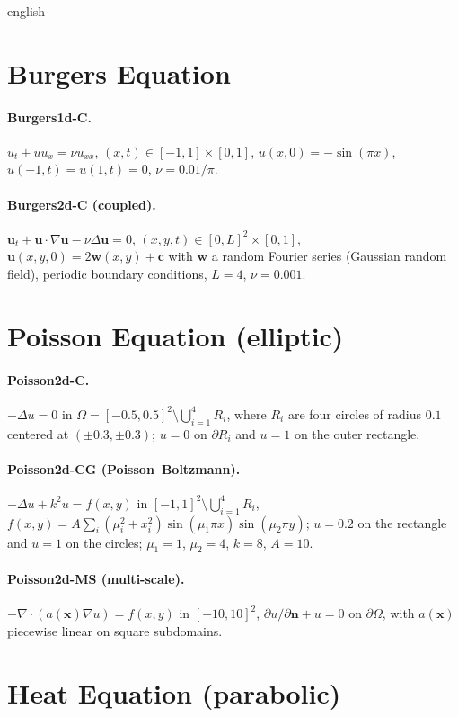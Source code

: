 \documentclass[12pt,letterpaper,twoside]{book}
\begin{document}
\begin{hyphenrules}{english}
\section{Burgers Equation}
\paragraph{Burgers1d-C.} $u_t+uu_x=\nu u_{xx}$, $(x,t)\in[-1,1]\times[0,1]$, $u(x,0)=-\sin(\pi x)$,
$u(-1,t)=u(1,t)=0$, $\nu=0.01/\pi$.

\paragraph{Burgers2d-C (coupled).} $\mathbf{u}_t+\mathbf{u}\cdot\nabla\mathbf{u}-\nu\Delta\mathbf{u}=0$,
$(x,y,t)\in[0,L]^2\times[0,1]$, $\mathbf{u}(x,y,0)=2\mathbf{w}(x,y)+\mathbf{c}$ with $\mathbf{w}$ a random
Fourier series (Gaussian random field), periodic boundary conditions, $L=4$, $\nu=0.001$.

\section{Poisson Equation (elliptic)}
\paragraph{Poisson2d-C.} $-\Delta u=0$ in $\Omega=[-0.5,0.5]^2\setminus\bigcup_{i=1}^{4}R_i$, where $R_i$
are four circles of radius $0.1$ centered at $(\pm0.3,\pm0.3)$; $u=0$ on $\partial R_i$ and $u=1$ on the
outer rectangle.

\paragraph{Poisson2d-CG (Poisson--Boltzmann).} $-\Delta u+k^2u=f(x,y)$ in
$[-1,1]^2\setminus\bigcup_{i=1}^{4}R_i$, $f(x,y)=A\sum_i(\mu_i^2+x_i^2)\sin(\mu_1\pi x)\sin(\mu_2\pi y)$;
$u=0.2$ on the rectangle and $u=1$ on the circles; $\mu_1=1$, $\mu_2=4$, $k=8$, $A=10$.

\paragraph{Poisson2d-MS (multi-scale).} $-\nabla\cdot(a(\mathbf{x})\nabla u)=f(x,y)$ in $[-10,10]^2$,
$\partial u/\partial\mathbf{n}+u=0$ on $\partial\Omega$, with $a(\mathbf{x})$ piecewise linear on square subdomains.

\section{Heat Equation (parabolic)}

\end{hyphenrules}
\end{document}
